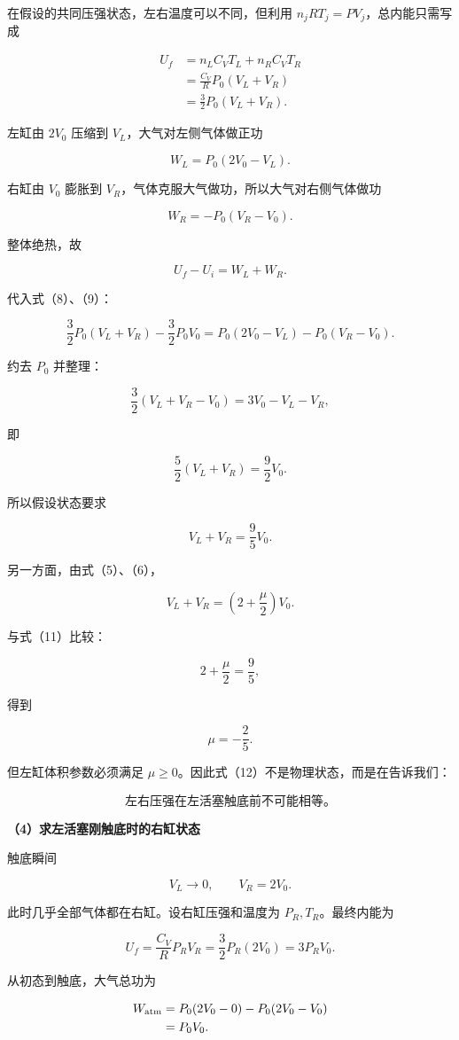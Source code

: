 \documentclass[12pt,a4paper,UTF8]{ctexart}
\begin{document}
在假设的共同压强状态，左右温度可以不同，但利用
\(n_jRT_j=PV_j\)，总内能只需写成

\[
\begin{aligned}
U_f
&=n_LC_VT_L+n_RC_VT_R\\
&=\frac{C_V}{R}P_0(V_L+V_R)\\
&=\frac32P_0(V_L+V_R).
\end{aligned}
\tag{9}
\]

左缸由 \(2V_0\) 压缩到 \(V_L\)，大气对左侧气体做正功

\[
W_L=P_0(2V_0-V_L).
\]

右缸由 \(V_0\) 膨胀到 \(V_R\)，气体克服大气做功，所以大气对右侧气体做功

\[
W_R=-P_0(V_R-V_0).
\]

整体绝热，故

\[
U_f-U_i=W_L+W_R.
\tag{10}
\]

代入式（8）、（9）：

\[
\frac32P_0(V_L+V_R)-\frac32P_0V_0
=P_0(2V_0-V_L)-P_0(V_R-V_0).
\]

约去 \(P_0\) 并整理：

\[
\frac32(V_L+V_R-V_0)=3V_0-V_L-V_R,
\]

即

\[
\frac52(V_L+V_R)=\frac92V_0.
\]

所以假设状态要求

\[
V_L+V_R=\frac95V_0.
\tag{11}
\]

另一方面，由式（5）、（6），

\[
V_L+V_R
=\left(2+\frac\mu2\right)V_0.
\]

与式（11）比较：

\[
2+\frac\mu2=\frac95,
\]

得到

\[
\mu=-\frac25.
\tag{12}
\]

但左缸体积参数必须满足
\(\mu\geq0\)。因此式（12）不是物理状态，而是在告诉我们：

\[
\boxed{\text{左右压强在左活塞触底前不可能相等。}}
\tag{13}
\]

\textbf{（4）求左活塞刚触底时的右缸状态}

触底瞬间

\[
V_L\to0,
\qquad
V_R=2V_0.
\tag{14}
\]

此时几乎全部气体都在右缸。设右缸压强和温度为 \(P_R,T_R\)。最终内能为

\[
U_f=\frac{C_V}{R}P_RV_R
=\frac32P_R(2V_0)=3P_RV_0.
\]

从初态到触底，大气总功为

\[
\begin{aligned}
W_{\rm atm}
&=P_0(2V_0-0)-P_0(2V_0-V_0)\\
&=P_0V_0.
\end{aligned}
\]
\end{document}
